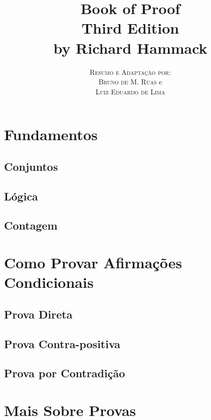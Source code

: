 \documentclass[a4paper,11pt,oneside]{book}
\title{\Huge \textbf{Book of Proof} \\ 
\Large Third Edition \\
\huge by Richard Hammack}
\author{
\textsc{Resumo e Adaptação por:} \\
\textsc{Bruno de M. Ruas} e \\ 
\textsc{Luiz Eduardo de Lima} 
}
\theoremstyle{definition}
\theoremstyle{break}
\begin{document}
\frontmatter
\maketitle

\tableofcontents

\mainmatter

\part{Fundamentos}

\chapter{Conjuntos}


\chapter{Lógica}


\chapter{Contagem}


\part{Como Provar Afirmações Condicionais}

\chapter{Prova Direta}


\chapter{Prova Contra-positiva}


\chapter{Prova por Contradição}


\part{Mais Sobre Provas}
\end{document}
